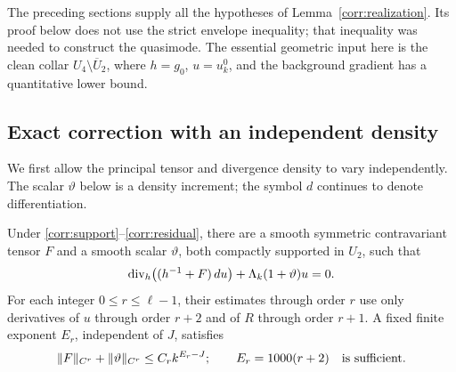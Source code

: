 The preceding sections supply all the hypotheses of
Lemma~\ref{corr:realization}.  Its proof below does not use the strict
envelope inequality; that inequality was needed to construct the
quasimode.  The essential geometric input here is the clean collar
\(U_4\setminus\overline U_2\), where \(h=g_0\), \(u=u_k^0\), and the
background gradient has a quantitative lower bound.

\subsection{Exact correction with an independent density}

We first allow the principal tensor and divergence density to vary
independently.  The scalar \(\vartheta\) below is a density increment;
the symbol \(d\) continues to denote differentiation.

\begin{lemma}\label{corr:weighted}
Under \eqref{corr:support}--\eqref{corr:residual}, there are a smooth
symmetric contravariant tensor \(F\) and a smooth scalar
\(\vartheta\), both compactly supported in \(U_2\), such that
\begin{equation}\label{corr:weighted-equation}
 \operatorname{div}_h\bigl((h^{-1}+F)\,du\bigr)
       +\Lambda_k(1+\vartheta)u=0.
\end{equation}
For each integer \(0\le r\le\ell-1\), their estimates through order \(r\)
use only derivatives of \(u\) through order \(r+2\) and of \(R\)
through order \(r+1\).  A fixed finite exponent \(E_r\), independent
of \(J\), satisfies
\begin{equation}\label{corr:weighted-estimate}
 \|F\|_{C^r}+\|\vartheta\|_{C^r}
       \le C_r k^{E_r-J};
 \qquad E_r=1000(r+2)\quad\hbox{is sufficient}.
\end{equation}
\end{lemma}

